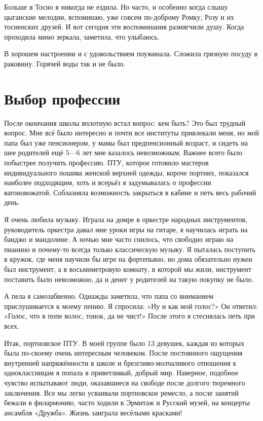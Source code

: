 Больше в Тосно я никогда не ездила.
Но часто, и особенно когда слышу цыганские мелодии, вспоминаю, уже совсем по-доброму Ромку, Розу и их тосненских друзей.
И вот сегодня эти воспоминания размягчили душу.
Когда проходила мимо зеркала, заметила, что улыбаюсь.

{\sloppy

В хорошем настроении и с удовольствием поужинала.
Сложила грязную посуду в раковину.
Горячей воды так и не было.

}

\section*{Выбор профессии}

После окончания школы вплотную встал вопрос: кем быть? 
Это был трудный вопрос.
Мне всё было интересно и почти все институты привлекали меня, но мой папа был уже пенсионером, у мамы был предпенсионный возраст, и сидеть на шее родителей ещё 5---6 лет мне казалось невозможным.
Важнее всего было побыстрее получить профессию.
ПТУ, которое готовило мастеров индивидуального пошива женской верхней одежды, короче портних, показался наиболее подходящим, хоть и всерьёз я задумывалась о профессии вагоновожатой.
Соблазняла возможность закрыться в кабине и петь весь рабочий день.

Я очень любила музыку.
Играла на домре в оркестре народных инструментов, руководитель оркестра давал мне уроки игры на гитаре, я научилась играть на банджо и мандолине.
А ночью мне часто снилось, что свободно играю на пианино и почему-то всегда только классическую музыку.
Я пыталась поступить в кружок, где меня научили бы игре на фортепьяно, но дома обязательно нужен был инструмент, а в восьмиметровую комнату, в которой мы жили, инструмент поставить было невозможно, да и денег у родителей на такую покупку не было.

А пела я самозабвенно.
Однажды заметила, что папа со вниманием прислушивается к моему пению.
Я спросила: «Ну и как мой голос?» 
Он ответил: «Голос, что в попе волос, тонок, да не чист!» 
После этого я стеснялась петь при всех.

Итак, портновское ПТУ.
В моей группе было 13 девушек, каждая из которых была по-своему очень интересным человеком.
После постоянного ощущения внутренней напряжённости в школе и брезгливо-молчаливого отношения к одноклассницам я попала в приветливый, добрый мир.
Наверное, подобное чувство испытывают люди, оказавшиеся на свободе после долгого тюремного заключения.
Все мы легко усваивали портновское ремесло, а после занятий бежали в филармонию, часто ходили в Эрмитаж и Русский музей, на концерты ансамбля «Дружба».
Жизнь заиграла весёлыми красками!

